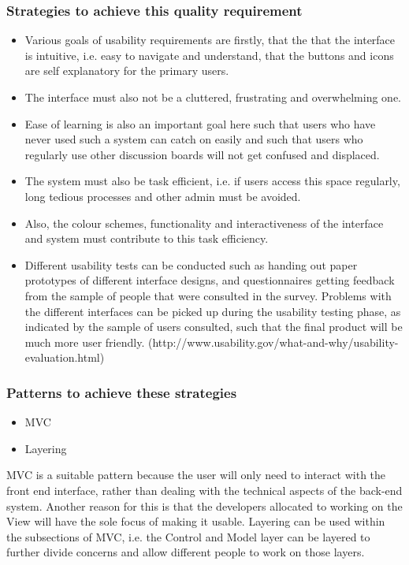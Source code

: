 \documentclass[12pt]{article}
\begin{document}
 \subsubsection{Strategies to achieve this quality requirement}
 \begin{itemize}
 \item Various goals of usability requirements are firstly, that the that the interface is intuitive, i.e. easy to navigate and understand, that the buttons and icons are self explanatory for the primary users.
 \item The interface must also not be a cluttered, frustrating and overwhelming one. 
 \item Ease of learning is also an important goal here such that users who have never used such a system can catch on easily and such that users who regularly use other discussion boards will not get confused and displaced. 
 \item The system must also be task efficient, i.e. if users access this space regularly, long tedious processes and other admin must be avoided.
\item Also, the colour schemes, functionality and interactiveness of the interface and system must contribute to this task efficiency. 
\item Different usability tests can be conducted such as handing out paper prototypes of different interface designs, and questionnaires getting feedback from the sample of people that were consulted in the survey. Problems with the different interfaces can be picked up during the usability testing phase, as indicated by the sample of users consulted, such that the final product will be much more user friendly. (http://www.usability.gov/what-and-why/usability-evaluation.html)
 \end{itemize}
 \subsubsection{Patterns to achieve these strategies}
 \begin{itemize}
 \item MVC
 \item Layering
\end{itemize}
MVC is a suitable pattern because the user will only need to interact with the front end interface, rather than dealing with the technical aspects of the back-end system. Another reason for this is that the developers allocated to working on the View will have the sole focus of making it usable.
Layering can be used within the subsections of MVC, i.e. the Control and Model layer can be layered to further divide concerns and allow different people to work on those layers.
\end{document}
